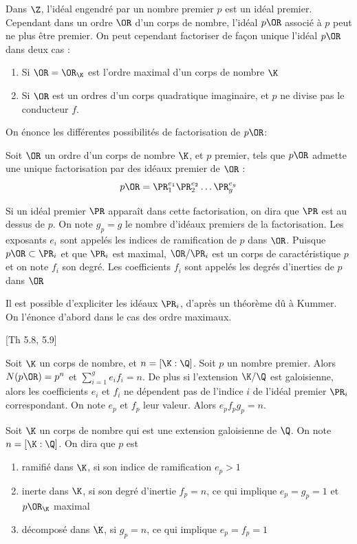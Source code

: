 Dans $\Z$, l'idéal engendré par un nombre premier $p$ est un idéal premier. Cependant dans un ordre $\OR$ d'un corps de nombre, l'idéal $p\OR$ associé à $p$ peut ne plus être premier. On peut cependant factoriser de façon unique l'idéal $p\OR$ dans deux cas :

\begin{enumerate}
	\item Si $\OR = \OR_{\K}$ est l'ordre maximal d'un corps de nombre $\K$
	\item Si $\OR$ est un ordres d'un corps quadratique imaginaire, et $p$ ne divise pas le conducteur $f$.
\end{enumerate}

On énonce les différentes possibilités de factorisation de $p\OR$:

\begin{Def}
	Soit $\OR$ un ordre d'un corps de nombre $\K$, et $p$ premier, tels que $p\OR$ admette une unique factorisation par des idéaux premier de $\OR$ :
	\begin{equation*}
		p\OR = \PR_{1}^{e_{1}}\PR_{2}^{e_{2}}\ldots\PR_{g}^{e_{g}}
	\end{equation*} 
	
	Si un idéal premier $\PR$ apparaît dans cette factorisation, on dira que $\PR$ est au dessus de $p$. On note $g_{p}=g$ le nombre d'idéaux premiers de la factorisation. Les exposants $e_{i}$ sont appelés les indices de ramification de $p$ dans $\OR$.
	Puisque $p\OR\subset\PR_{i}$ et que $\PR_{i}$ est maximal, $\OR/\PR_{i}$ est un corps de caractéristique $p$ et on note $f_{i}$ son degré. Les coefficients $f_{i}$ sont appelés les degrés d'inerties de $p$ dans $\OR$
\end{Def}

Il est possible d'expliciter les idéaux $\PR_{i}$, d'après un théorème dû à Kummer. On l'énonce d'abord dans le cas des ordre maximaux.

\begin{Prop}\cite{Cox}[Th 5.8, 5.9]
	
	Soit $\K$ un corps de nombre, et $n = \left[ \K : \Q\right] $. Soit $p$ un nombre premier. Alors $N(p\OR) = p^{n}$ et $\sum_{i = 1}^{g}e_{i}f_{i} = n$.
	De plus si l'extension $\K/\Q$ est galoisienne, alors les coefficients $e_{i}$ et $f_{i}$ ne dépendent pas de l'indice $i$ de l'idéal premier $\PR_{i}$ correspondant.  
	On note $e_{p}$ et $f_{p}$ leur valeur. Alors $e_{p}f_{p}g_{p} = n$.
\end{Prop}

\begin{Def}
	Soit $\K$ un corps de nombre qui est une extension galoisienne de $\Q$. On note $n = \left[ \K : \Q\right] $. On dira que $p$ est
	\begin{enumerate}
		\item ramifié dans $\K$, si son indice de ramification $e_{p} > 1$
		\item inerte dans $\K$, si son degré d'inertie $f_{p} = n$, ce qui implique $e_{p} = g_{p} = 1$ et $p\OR_{\K}$ maximal
		\item décomposé dans $\K$, si $g_{p} = n$, ce qui implique $e_{p} = f_{p} = 1$
	\end{enumerate}
\end{Def}

